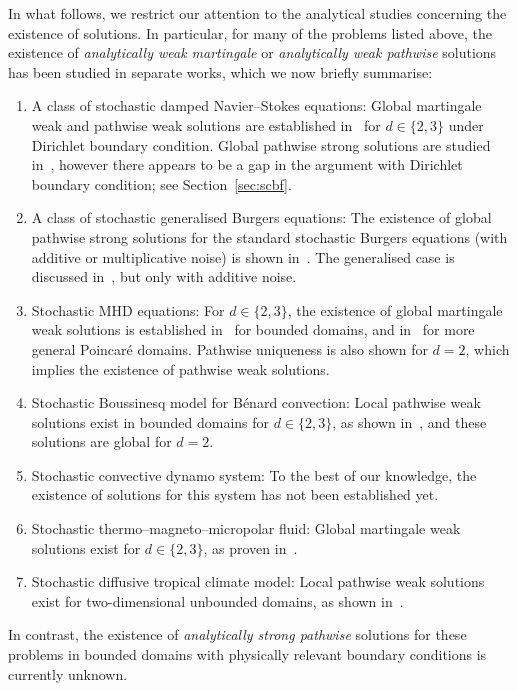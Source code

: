 \documentclass[11pt, reqno]{amsart}
\theoremstyle{definition}
\numberwithin{equation}{section}
\begin{document}
In what follows, we restrict our attention to the analytical studies concerning the existence of solutions. In particular, for many of the problems listed above, the existence of \emph{analytically weak martingale} or \emph{analytically weak pathwise} solutions has been studied in separate works, which we now briefly summarise:
\begin{enumerate}
\item A class of stochastic damped Navier--Stokes equations: Global martingale weak and pathwise weak solutions are established in~\cite{KinMoh23, KinCipMoh25} for $d\in \{2,3\}$ under Dirichlet boundary condition. Global pathwise strong solutions are studied in~\cite{GaoLiu19b,LiuGao18}, however there appears to be a gap in the argument with Dirichlet boundary condition; see Section~\ref{sec:scbf}.
\item A class of stochastic generalised Burgers equations: The existence of global pathwise strong solutions for the standard stochastic Burgers equations (with additive or multiplicative noise) is shown in~\cite{BrzGolNek14, DaGat95, DonGuoWuZho23, DonWuZho24}. The generalised case is discussed in~\cite{Kim06}, but only with additive noise.
\item Stochastic MHD equations: For $d \in\{2,3\}$, the existence of global martingale weak solutions is established in~\cite{SriSun99, Yam16} for bounded domains, and in~\cite{Mot22} for more general Poincar\'e domains. Pathwise uniqueness is also shown for $d=2$, which implies the existence of pathwise weak solutions.
\item Stochastic Boussinesq model for B\'enard convection: Local pathwise weak solutions exist in bounded domains for $d\in \{2,3\}$, as shown in~\cite{ChuMil10}, and these solutions are global for $d=2$.
\item Stochastic convective dynamo system: To the best of our knowledge, the existence of solutions for this system has not been established yet.
\item Stochastic thermo–magneto–micropolar fluid: Global martingale weak solutions exist for $d\in \{2,3\}$, as proven in~\cite{Yam14, Yam16m}.
\item Stochastic diffusive tropical climate model: Local pathwise weak solutions exist for two-dimensional unbounded domains, as shown in~\cite{YinYan23}.
\end{enumerate}
In contrast, the existence of \emph{analytically strong pathwise} solutions for these problems in bounded domains with physically relevant boundary conditions is currently unknown. 
\end{document}
